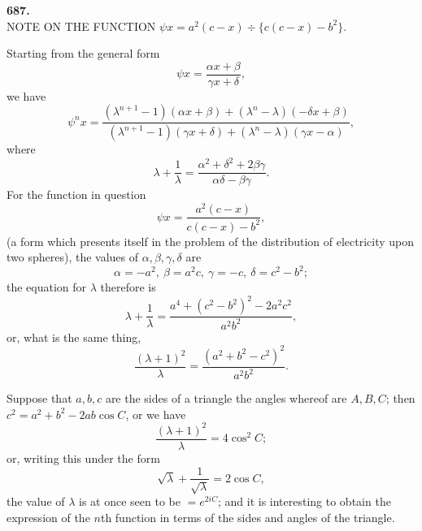 \documentclass[11pt,a4paper]{article}
\begin{document}
\newpage



\begin{center}
\textbf{687.}\\[6pt]
\large NOTE ON THE FUNCTION $\psi x = a^{2}(c - x) \div \{c(c - x) - b^{2}\}$.
\end{center}

\medskip


\medskip

Starting from the general form
\[
\psi x = \frac{\alpha x + \beta}{\gamma x + \delta},
\]
we have
\[
\psi^{n}x = \frac{(\lambda^{n+1} - 1)(\alpha x + \beta) + (\lambda^{n} - \lambda)(-\delta x + \beta)}{(\lambda^{n+1} - 1)(\gamma x + \delta) + (\lambda^{n} - \lambda)(\gamma x - \alpha)},
\]
where
\[
\lambda + \frac{1}{\lambda} = \frac{\alpha^{2} + \delta^{2} + 2\beta\gamma}{\alpha\delta - \beta\gamma}.
\]
For the function in question
\[
\psi x = \frac{a^{2}(c - x)}{c(c - x) - b^{2}},
\]
(a form which presents itself in the problem of the distribution of electricity upon two spheres), the values of $\alpha, \beta, \gamma, \delta$ are
\[
\alpha = -a^{2},\ \beta = a^{2}c,\ \gamma = -c,\ \delta = c^{2} - b^{2};
\]
the equation for $\lambda$ therefore is
\[
\lambda + \frac{1}{\lambda} = \frac{a^{4} + (c^{2} - b^{2})^{2} - 2a^{2}c^{2}}{a^{2}b^{2}},
\]
or, what is the same thing,
\[
\frac{(\lambda + 1)^{2}}{\lambda} = \frac{(a^{2} + b^{2} - c^{2})^{2}}{a^{2}b^{2}}.
\]

\newpage


Suppose that $a, b, c$ are the sides of a triangle the angles whereof are $A, B, C$; then $c^{2} = a^{2} + b^{2} - 2ab\cos C$, or we have
\[
\frac{(\lambda + 1)^{2}}{\lambda} = 4\cos^{2}C;
\]
or, writing this under the form
\[
\sqrt{\lambda} + \frac{1}{\sqrt{\lambda}} = 2\cos C,
\]
the value of $\lambda$ is at once seen to be $= e^{2iC}$; and it is interesting to obtain the expression of the $n$th function in terms of the sides and angles of the triangle.

\medskip
\end{document}

